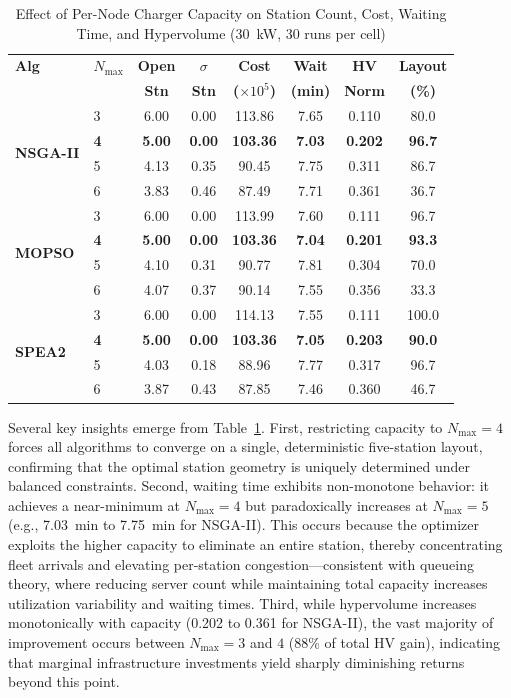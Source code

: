 \documentclass[conference]{IEEEtran}
\begin{document}
\begin{table}[htbp]
\caption{Effect of Per-Node Charger Capacity on Station Count, Cost, Waiting Time, and Hypervolume (30~kW, 30 runs per cell)}
\label{tab:sensitivity}
\centering
\scriptsize
\renewcommand{\arraystretch}{1.20}
\begin{tabular}{@{}llcccccc@{}}
\toprule
\textbf{Alg} & \textbf{$N_{\max}$} & \textbf{Open} & \textbf{$\sigma$} & \textbf{Cost} & \textbf{Wait} & \textbf{HV} & \textbf{Layout} \\
 & & \textbf{Stn} & \textbf{Stn} & \textbf{($\times 10^5$)} & \textbf{(min)} & \textbf{Norm} & \textbf{(\%)} \\
\midrule
\multirow{4}{*}{\textbf{NSGA-II}} & 3 & 6.00 & 0.00 & 113.86 & 7.65 & 0.110 & 80.0 \\
 & \textbf{4} & \textbf{5.00} & \textbf{0.00} & \textbf{103.36} & \textbf{7.03} & \textbf{0.202} & \textbf{96.7} \\
 & 5 & 4.13 & 0.35 & 90.45 & 7.75 & 0.311 & 86.7 \\
 & 6 & 3.83 & 0.46 & 87.49 & 7.71 & 0.361 & 36.7 \\
\midrule
\multirow{4}{*}{\textbf{MOPSO}} & 3 & 6.00 & 0.00 & 113.99 & 7.60 & 0.111 & 96.7 \\
 & \textbf{4} & \textbf{5.00} & \textbf{0.00} & \textbf{103.36} & \textbf{7.04} & \textbf{0.201} & \textbf{93.3} \\
 & 5 & 4.10 & 0.31 & 90.77 & 7.81 & 0.304 & 70.0 \\
 & 6 & 4.07 & 0.37 & 90.14 & 7.55 & 0.356 & 33.3 \\
\midrule
\multirow{4}{*}{\textbf{SPEA2}} & 3 & 6.00 & 0.00 & 114.13 & 7.55 & 0.111 & 100.0 \\
 & \textbf{4} & \textbf{5.00} & \textbf{0.00} & \textbf{103.36} & \textbf{7.05} & \textbf{0.203} & \textbf{90.0} \\
 & 5 & 4.03 & 0.18 & 88.96 & 7.77 & 0.317 & 96.7 \\
 & 6 & 3.87 & 0.43 & 87.85 & 7.46 & 0.360 & 46.7 \\
\bottomrule
\end{tabular}
\end{table}

Several key insights emerge from Table~\ref{tab:sensitivity}. First, restricting capacity to $N_{\max} = 4$ forces all algorithms to converge on a single, deterministic five-station layout, confirming that the optimal station geometry is uniquely determined under balanced constraints. Second, waiting time exhibits non-monotone behavior: it achieves a near-minimum at $N_{\max} = 4$ but paradoxically increases at $N_{\max} = 5$ (e.g., 7.03~min to 7.75~min for NSGA-II). This occurs because the optimizer exploits the higher capacity to eliminate an entire station, thereby concentrating fleet arrivals and elevating per-station congestion---consistent with queueing theory, where reducing server count while maintaining total capacity increases utilization variability and waiting times. Third, while hypervolume increases monotonically with capacity (0.202 to 0.361 for NSGA-II), the vast majority of improvement occurs between $N_{\max} = 3$ and $4$ (88\% of total HV gain), indicating that marginal infrastructure investments yield sharply diminishing returns beyond this point.
\end{document}
